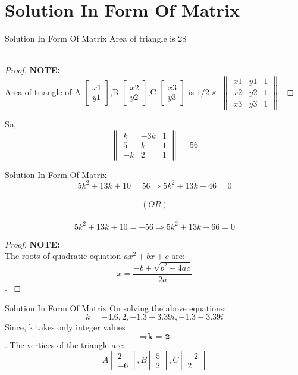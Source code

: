 \documentclass{beamer}
\begin{document}
\section{Solution In Form Of Matrix}
\begin{frame}{Solution In Form Of Matrix}
Area of triangle is 28
\\~\\
\begin{proof}{\textbf{NOTE:}}
	{
    \\
    Area of triangle of A
    $\begin{bmatrix} x1 \\ y1 \end{bmatrix}$,B
    $\begin{bmatrix} x2 \\ y2 \end{bmatrix}$,C
    $\begin{bmatrix} x3 \\ y3 \end{bmatrix}$ is
    $1/2 \times$
    $\begin{Vmatrix} x1 & y1 & 1 \\ x2 & y2 & 1 \\ x3 & y3 & 1 \end{Vmatrix}$
    }
\end{proof}
So,
\[\begin{Vmatrix} k & -3k & 1 \\ 5 & k & 1 \\ -k & 2 & 1 \end{Vmatrix} = 56\]
\end{frame}
\begin{frame}{Solution In Form Of Matrix}
\[5k^2 + 13k + 10 = 56 \Rightarrow 5k^2 + 13k - 46 = 0\] 
\
\[(OR)\]
\
\[5k^2 + 13k + 10 = -56 \Rightarrow 5k^2 + 13k + 66 = 0\]
\begin{proof}{\textbf{NOTE:}}
    {
    \\
    The roots of quadratic equation \(ax^2 + bx + c\) are: 
    \[x=\frac{-b\pm\sqrt{b^2-4ac}}{2a}\].
    }
\end{proof}
\end{frame}
\begin{frame}{Solution In Form Of Matrix}
On solving the above equations:
\[k = -4.6, 2, -1.3+3.39i, -1.3-3.39i\]
Since, k takes only integer values
\[\Rightarrow\textbf{k = 2}\].
The vertices of the triangle are:
\\
\[A
\begin{bmatrix} 2 \\ -6 \end{bmatrix},B
\begin{bmatrix} 5 \\ 2 \end{bmatrix},C
\begin{bmatrix} -2 \\ 2 \end{bmatrix}\]
\end{frame}
\end{document}
